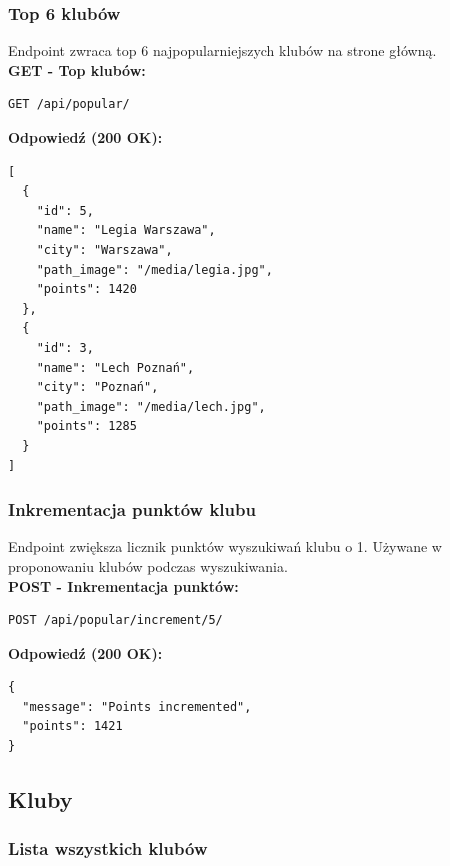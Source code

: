 \documentclass[a4paper,12pt]{article}
\begin{document}
\subsubsection{Top 6 klubów}

Endpoint zwraca top 6 najpopularniejszych klubów na strone główną. \\

\textbf{GET - Top klubów:}
\begin{lstlisting}
GET /api/popular/
\end{lstlisting}

\vspace{0.5cm}

\textbf{Odpowiedź (200 OK):}
\begin{lstlisting}
[
  {
    "id": 5,
    "name": "Legia Warszawa",
    "city": "Warszawa",
    "path_image": "/media/legia.jpg",
    "points": 1420
  },
  {
    "id": 3,
    "name": "Lech Poznań",
    "city": "Poznań",
    "path_image": "/media/lech.jpg",
    "points": 1285
  }
]
\end{lstlisting}

\newpage

\subsubsection{Inkrementacja punktów klubu}

Endpoint zwiększa licznik punktów wyszukiwań klubu o 1. Używane w proponowaniu klubów podczas wyszukiwania. \\

\textbf{POST - Inkrementacja punktów:}
\begin{lstlisting}
POST /api/popular/increment/5/
\end{lstlisting}

\vspace{0.5cm}

\textbf{Odpowiedź (200 OK):}
\begin{lstlisting}
{
  "message": "Points incremented",
  "points": 1421
}
\end{lstlisting}

\newpage

\subsection{Kluby}

\subsubsection{Lista wszystkich klubów}
\end{document}
